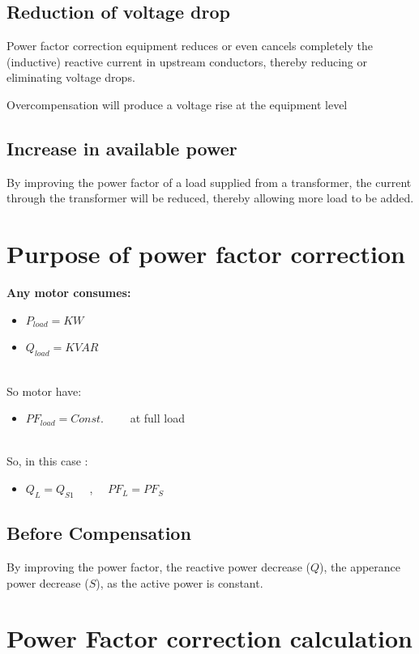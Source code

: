 \documentclass[12pt,fleqn]{book} %
\begin{document}
\subsection{Reduction of voltage drop}
Power factor correction equipment reduces or even cancels completely the (inductive) reactive current in upstream conductors, thereby reducing or eliminating voltage drops.
\begin{note}
Overcompensation will produce a voltage rise at the equipment level
\end{note}
\subsection{Increase in available power}
By improving the power factor of a load supplied from a transformer, the current through the transformer will be reduced, thereby allowing more load to be added.
\section{Purpose of power factor correction}
\textbf{Any motor consumes:}
\begin{itemize}
    \item $P_{load}=KW$
    \item $Q_{load}=KVAR$
\end{itemize}
\\ So motor have:
\begin{itemize}
    \item $PF_{load}=Const.$ \ \ \ \ at full load
\end{itemize}
\\ So, in this case :
\begin{itemize}
    \item $Q_{L}=Q_{S1}$ \ \ , \ \ $PF_{L}=PF_{S}$
\end{itemize}
\subsection{Before Compensation}
By improving the power factor, the reactive power decrease ($Q$), the apperance power decrease ($S$), as the active power is constant.
\section{Power Factor correction calculation}
\end{document}
